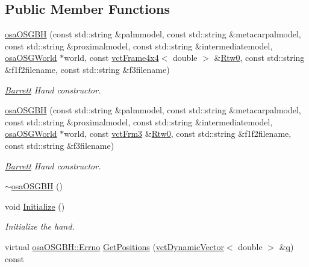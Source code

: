 \subsection*{Public Member Functions}
\begin{DoxyCompactItemize}
\item 
\hyperlink{classosa_o_s_g_b_h_a4508c7bf1b6257c84c0486f4ef3e757a}{osa\+O\+S\+G\+B\+H} (const std\+::string \&palmmodel, const std\+::string \&metacarpalmodel, const std\+::string \&proximalmodel, const std\+::string \&intermediatemodel, \hyperlink{classosa_o_s_g_world}{osa\+O\+S\+G\+World} $\ast$world, const \hyperlink{classvct_frame4x4}{vct\+Frame4x4}$<$ double $>$ \&\hyperlink{classrob_manipulator_ab48d9d9a166bf252698bc35788ca6ad6}{Rtw0}, const std\+::string \&f1f2filename, const std\+::string \&f3filename)
\begin{DoxyCompactList}\small\item\em \hyperlink{struct_barrett}{Barrett} Hand constructor. \end{DoxyCompactList}\item 
\hyperlink{classosa_o_s_g_b_h_af4458de175613dbaca339a38fd884365}{osa\+O\+S\+G\+B\+H} (const std\+::string \&palmmodel, const std\+::string \&metacarpalmodel, const std\+::string \&proximalmodel, const std\+::string \&intermediatemodel, \hyperlink{classosa_o_s_g_world}{osa\+O\+S\+G\+World} $\ast$world, const \hyperlink{vct_transformation_types_8h_a81feda0a02c2d1bc26e5553f409fed20}{vct\+Frm3} \&\hyperlink{classrob_manipulator_ab48d9d9a166bf252698bc35788ca6ad6}{Rtw0}, const std\+::string \&f1f2filename, const std\+::string \&f3filename)
\begin{DoxyCompactList}\small\item\em \hyperlink{struct_barrett}{Barrett} Hand constructor. \end{DoxyCompactList}\item 
\hyperlink{classosa_o_s_g_b_h_ac54caffaf85727506bb140f6cb2e401a}{$\sim$osa\+O\+S\+G\+B\+H} ()
\item 
void \hyperlink{classosa_o_s_g_b_h_a2955c266753c3f514f728aa76832aaf1}{Initialize} ()
\begin{DoxyCompactList}\small\item\em Initialize the hand. \end{DoxyCompactList}\item 
virtual \hyperlink{classrob_manipulator_a7bbb51cdb81c9c681075a9274ca0cdc0}{osa\+O\+S\+G\+B\+H\+::\+Errno} \hyperlink{classosa_o_s_g_b_h_adc2f5a393d13e909ee1f04bd1195e9dd}{Get\+Positions} (\hyperlink{classvct_dynamic_vector}{vct\+Dynamic\+Vector}$<$ double $>$ \&\hyperlink{classosa_o_s_g_manipulator_a834ce7263dace4d925133753522abaa3}{q}) const 

\end{DoxyCompactItemize}
